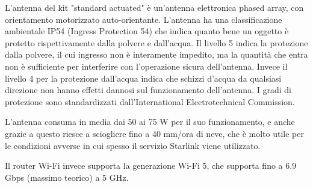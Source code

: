 L'antenna del kit "standard actuated" è un'antenna elettronica phased array, con orientamento motorizzato auto-orientante.
L'antenna ha una classificazione ambientale IP54 (Ingress Protection 54) che indica quanto bene un oggetto è protetto rispettivamente dalla polvere e dall'acqua.
Il livello 5 indica la protezione dalla polvere, il cui ingresso non è interamente impedito, ma la quantità che entra non è sufficiente per interferire con l'operazione sicura dell'antenna.
Invece il livello 4 per la protezione dall'acqua indica che schizzi d'acqua da qualsiasi direzione non hanno effetti dannosi sul funzionamento dell'antenna.
I gradi di protezione sono standardizzati dall'International Electrotechnical Commission.

L'antenna consuma in media dai 50 ai 75 W per il suo funzionamento, e anche grazie a questo riesce a sciogliere fino a 40 mm/ora di neve, che è molto utile per le condizioni avverse in cui spesso il servizio Starlink viene utilizzato.

Il router Wi-Fi invece supporta la generazione Wi-Fi 5, che supporta fino a 6.9 Gbps (massimo teorico) a 5 GHz.